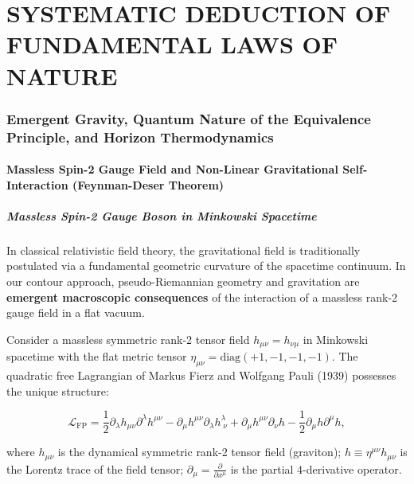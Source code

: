 \documentclass[11pt,a4paper]{article}
\theoremstyle{definition}
\begin{document}
\part{SYSTEMATIC DEDUCTION OF FUNDAMENTAL LAWS OF NATURE}\label{part:2}

\section{Emergent Gravity, Quantum Nature of the Equivalence Principle, and Horizon Thermodynamics}\label{sec:rozdil2}

\subsection{Massless Spin-2 Gauge Field and Non-Linear Gravitational Self-Interaction (Feynman-Deser Theorem)}\label{sec:2.1}

\subsubsection{Massless Spin-2 Gauge Boson in Minkowski Spacetime}\label{sec:2.1.1}

In classical relativistic field theory, the gravitational field is traditionally postulated via a fundamental geometric curvature of the spacetime continuum. In our contour approach, pseudo-Riemannian geometry and gravitation are \textbf{emergent macroscopic consequences} of the interaction of a massless rank-2 gauge field in a flat vacuum.

Consider a massless symmetric rank-2 tensor field $h_{\mu\nu} = h_{\nu\mu}$ in Minkowski spacetime with the flat metric tensor $\eta_{\mu\nu} = \text{diag}(+1, -1, -1, -1)$. The quadratic free Lagrangian of Markus Fierz and Wolfgang Pauli (1939) possesses the unique structure:

\begin{equation}\label{eq:2.1}\tag{2.1}
\mathcal{L}_{\text{FP}} = \frac{1}{2} \partial_\lambda h_{\mu\nu} \partial^\lambda h^{\mu\nu} - \partial_\mu h^{\mu\nu} \partial_\lambda h^\lambda_{\;\nu} + \partial_\mu h^{\mu\nu} \partial_\nu h - \frac{1}{2} \partial_\mu h \partial^\mu h,
\end{equation}

where $h_{\mu\nu}$ is the dynamical symmetric rank-2 tensor field (graviton);  
$h \equiv \eta^{\mu\nu} h_{\mu\nu}$ is the Lorentz trace of the field tensor;  
$\partial_\mu = \frac{\partial}{\partial x^\mu}$ is the partial 4-derivative operator.
\end{document}
